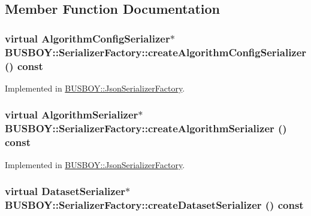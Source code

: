\subsection{Member Function Documentation}
\hypertarget{classBUSBOY_1_1SerializerFactory_a3df659bd0484f2dc289b936df8dfa5a8}{
\subsubsection[{createAlgorithmConfigSerializer}]{\setlength{\rightskip}{0pt plus 5cm}virtual {\bf AlgorithmConfigSerializer}$\ast$ BUSBOY::SerializerFactory::createAlgorithmConfigSerializer () const}}
\label{classBUSBOY_1_1SerializerFactory_a3df659bd0484f2dc289b936df8dfa5a8}


Implemented in \hyperlink{classBUSBOY_1_1JsonSerializerFactory_a54d006f2e2a308e12ce60a418cea0436}{BUSBOY::JsonSerializerFactory}.\hypertarget{classBUSBOY_1_1SerializerFactory_abe18c71b6f595c80c435c5682a0e950f}{
\subsubsection[{createAlgorithmSerializer}]{\setlength{\rightskip}{0pt plus 5cm}virtual {\bf AlgorithmSerializer}$\ast$ BUSBOY::SerializerFactory::createAlgorithmSerializer () const}}
\label{classBUSBOY_1_1SerializerFactory_abe18c71b6f595c80c435c5682a0e950f}


Implemented in \hyperlink{classBUSBOY_1_1JsonSerializerFactory_a575cec17e9b4dffa5eba3f7747414d89}{BUSBOY::JsonSerializerFactory}.\hypertarget{classBUSBOY_1_1SerializerFactory_ae8e6bceb0e8e3a3b7f72dca8930376fb}{
\subsubsection[{createDatasetSerializer}]{\setlength{\rightskip}{0pt plus 5cm}virtual {\bf DatasetSerializer}$\ast$ BUSBOY::SerializerFactory::createDatasetSerializer () const}}
\label{classBUSBOY_1_1SerializerFactory_ae8e6bceb0e8e3a3b7f72dca8930376fb}


